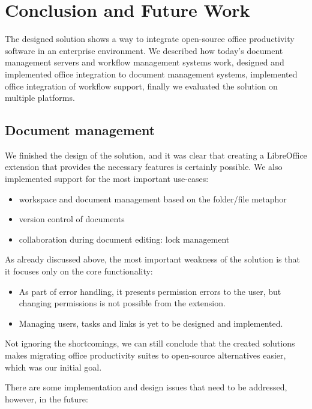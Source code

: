 \chapter{Conclusion and Future Work}

The designed solution shows a way to integrate open-source office productivity
software in an enterprise environment. We described how today's document
management servers and workflow management systems work, designed and
implemented office integration to document management systems, implemented
office integration of workflow support, finally we evaluated the solution on
multiple platforms.

\section{Document management}

We finished the design of the solution, and it was clear that creating a
LibreOffice extension that provides the necessary features is certainly
possible. We also implemented support for the most important use-cases:

\begin{itemize}
\item workspace and document management based on the folder/file metaphor
\item version control of documents
\item collaboration during document editing: lock management
\end{itemize}

As already discussed above, the most important weakness of the solution is that
it focuses only on the core functionality:

\begin{itemize}
\item As part of error handling, it presents permission errors to the user, but
changing permissions is not possible from the extension.
\item Managing users, tasks and links is yet to be designed and implemented.
\end{itemize}

Not ignoring the shortcomings, we can still conclude that the created solutions
makes migrating office productivity suites to open-source alternatives easier,
which was our initial goal.

There are some implementation and design issues that need to be addressed,
however, in the future:

